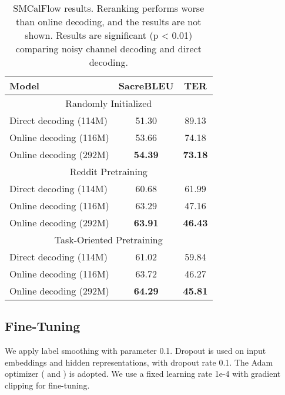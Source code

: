 \documentclass[11pt,a4paper]{article}
\begin{document}
\begin{table}[t]
    \centering
    \footnotesize
    \renewcommand{\arraystretch}{0.9}
    \begin{tabular}{lcc}
        \toprule
        \textbf{Model}   & \textbf{SacreBLEU } & \textbf{TER }  \\ \midrule
       \multicolumn{3}{c}{Randomly Initialized} \\ \midrule
        Direct decoding (114M) & 51.30 & 89.13\\
Online decoding (116M) & 53.66 & 74.18\\
Online decoding (292M) & \textbf{54.39} & \textbf{73.18}\\
        \midrule\multicolumn{3}{c}{Reddit Pretraining} \\ \midrule
        Direct decoding (114M) & 60.68 & 61.99\\
Online decoding (116M) & 63.29 & 47.16\\
Online decoding (292M) & \textbf{63.91} & \textbf{46.43}\\
 \midrule
        \multicolumn{3}{c}{Task-Oriented Pretraining} \\ \midrule
        Direct decoding (114M) & 61.02 & 59.84\\
Online decoding (116M) & 63.72 & 46.27\\
Online decoding (292M) & \textbf{64.29} & \textbf{45.81}\\
    \bottomrule
    \end{tabular}
\caption{SMCalFlow results. Reranking performs worse than online decoding, and the results are not shown. Results are significant (p < 0.01) comparing noisy channel decoding and direct decoding. \label{tab:semantic_machine_end2end}}
\end{table}

\subsection{Fine-Tuning \label{sec:fine_tuning}}

We apply label smoothing with parameter 0.1. Dropout is used on input embeddings and hidden representations, with dropout rate 0.1. The Adam optimizer \cite{kingma2014adam} ( and ) is adopted. We use a fixed learning rate 1e-4 with gradient clipping for fine-tuning. 
\end{document}
